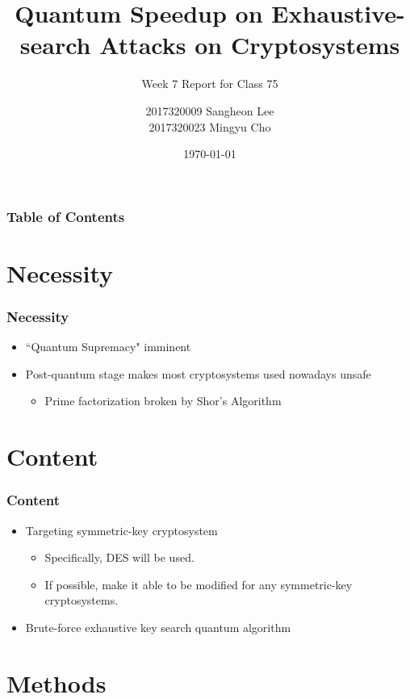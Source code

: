 \documentclass{beamer}
\title{Quantum Speedup on Exhaustive-search Attacks on Cryptosystems}
\subtitle{Week 7 Report for Class 75}
\author{2017320009 Sangheon Lee\\ 2017320023 Mingyu Cho}
\date{\today}
\newif\ifproposal
\begin{document}
	\begin{frame}
		\titlepage
	\end{frame}
	
	\begin{frame}
		\frametitle{Table of Contents}
		\tableofcontents
	\end{frame}
	
	\ifproposal
	\section{Necessity}
	
	\begin{frame}
		\frametitle{Necessity}
		
		\begin{itemize}
			\item ``Quantum Supremacy" imminent
			\item Post-quantum stage makes most cryptosystems used nowadays unsafe
			\begin{itemize}
				\item Prime factorization broken by Shor's Algorithm
			\end{itemize}
		\end{itemize}
	\end{frame}
	
	\section{Content}
	
	\begin{frame}
		\frametitle{Content}
		
		\begin{itemize}
			\item Targeting symmetric-key cryptosystem
			\begin{itemize}
				\item Specifically, DES will be used.
				\item If possible, make it able to be modified for any symmetric-key cryptosystems.
			\end{itemize}
			\item Brute-force exhaustive key search quantum algorithm
		\end{itemize}
	\end{frame}
	
	\section{Methods}
	
\end{document}
